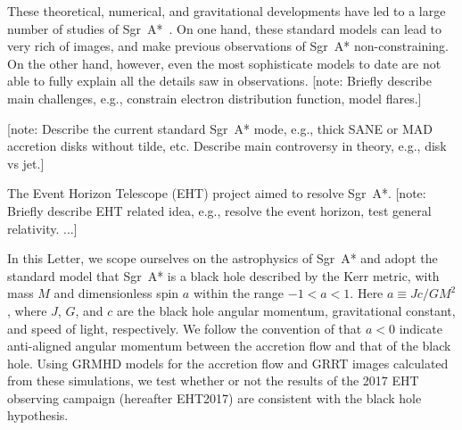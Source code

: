 \documentclass[twocolumn,tighten,dvipsnames]{aastex63}
\newcommand\sgra{Sgr~A*\xspace}
\newcommand\mbh{{M}} %
\newcommand\abh{{a}} %
\newcommand\<{{\langle}}
\renewcommand\>{{\rangle}} %
\newcommand\note[1]{{\color{OliveGreen}[note: #1]}}
\begin{document}
These theoretical, numerical, and gravitational developments have led
to a large number of studies of
\sgra~\citep[e.g.,][]{2006MNRAS.370..219M, 2007MNRAS.379.1519M,
  2009A&A...508L..13M, 2009ApJ...698..676D, 2009ApJ...701..521C,
  2009ApJ...706..497M, 2012MNRAS.421.1315Z, 2013A&A...559L...3M,
  2014A&A...570A...7M, 2014ApJ...790....1B, 2015A&A...576A..41B,
  2015ApJ...799....1C, 2015ApJ...802...69B, 2015ApJ...812..103C,
  2015Sci...350.1242J, 2016A&A...588A..57F, 2016ApJ...817..173L,
  2016ApJ...824...40O, 2016ApJ...826...77B, 2016ApJ...831....4P,
  2016MNRAS.455.2187M, 2017ApJ...837..180G, 2017ApJ...844...35M,
  2017ApJ...851..148M, 2017MNRAS.467.3604R, 2018A&A...612A..34D,
  2018ApJ...856..163M, 2018ApJ...859...60L, 2018ApJ...863..148P,
  2018ApJ...865..104J, 2018ApJ...868..101B, 2018JCAP...07..015H,
  2018MNRAS.478.1875J, 2018MNRAS.478.5209C, 2019ApJ...871...30I,
  2019ApJ...881L...2B, 2019ApJ...884..148B, 2019ApJ...886...96H,
  2020ApJ...896L...6R, 2020ApJ...897...99T, 2020MNRAS.492.3272R,
  2020MNRAS.493.1404A, 2020MNRAS.494.4168D, 2020MNRAS.494.5923P,
  2020arXiv200514251B, 2020arXiv200603657D, 2020arXiv200603658P}.
On one hand, these standard models can lead to very rich of images,
and make previous observations of \sgra non-constraining.
On the other hand, however, even the most sophisticate models to date
are not able to fully explain all the details saw in observations.
\note{Briefly describe main challenges, e.g., constrain electron
  distribution function, model flares.}

\note{Describe the current standard \sgra mode, e.g., thick SANE or
  MAD accretion disks without tilde, etc.
  Describe main controversy in theory, e.g., disk vs jet.}

The Event Horizon Telescope (EHT) project aimed to resolve \sgra.
\note{Briefly describe EHT related idea, e.g., resolve the event
  horizon, test general relativity.
  \citet{2000ApJ...528L..13F} ...}

In this Letter, we scope ourselves on the astrophysics of \sgra and
adopt the standard model that \sgra is a black hole described by the
Kerr metric, with mass $\mbh$ and dimensionless spin $\abh$ within the
range $-1 < \abh < 1$.
Here $\abh \equiv Jc/G\mbh^2$, where $J$, $G$, and $c$ are the black
hole angular momentum, gravitational constant, and speed of light,
respectively.
We follow the convention of  that
$\abh < 0$ indicate anti-aligned angular momentum between the
accretion flow and that of the black hole.
Using GRMHD models for the accretion flow and GRRT images calculated
from these simulations, we test whether or not the results of the 2017
EHT observing campaign (hereafter EHT2017) are consistent with the
black hole hypothesis.
\end{document}
